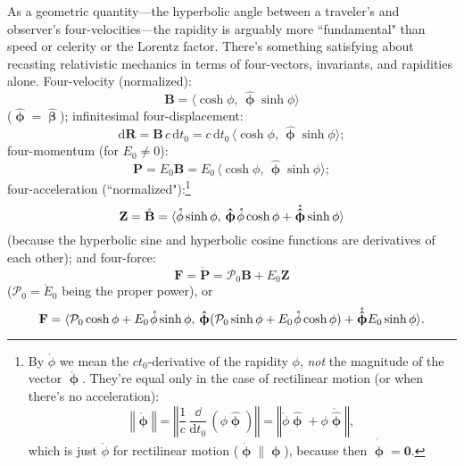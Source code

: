 \documentclass[12pt]{article}
\renewcommand{\vv}[1]{\mathbf{#1}}
\newcommand{\dd}[1]{\mathrm{d}#1}
\newcommand{\hatbeta}{\bm{\hat{\upbeta}}}
\newcommand{\vvphi}{\bm{\upphi}}
\newcommand{\hatphi}{\bm{\hat{\upphi}}}
\begin{document}
As a geometric quantity---the hyperbolic angle between a traveler's and observer's four-velocities---the rapidity is arguably more ``fundamental" than speed or celerity or the Lorentz factor. There's something satisfying about recasting relativistic mechanics in terms of four-vectors, invariants, and rapidities alone. Four-velocity (normalized):
\begin{equation*}
\vv B = \langle \cosh{\phi}, \, \hatphi \sinh{\phi} \rangle
\end{equation*}
($\hatphi = \hatbeta$); infinitesimal four-displacement:
\begin{equation*}
\dd \vv R = \vv B \, c \, \dd t_0 = c \, \dd t_0 \, \langle \cosh{\phi}, \, \hatphi \sinh{\phi} \rangle ;
\end{equation*}
four-momentum (for $E_0 \neq 0$):
\begin{equation*}
\vv P = E_0 \vv B = E_0 \, \langle \cosh{\phi}, \, \hatphi \sinh{\phi} \rangle ;
\end{equation*}
four-acceleration (``normalized"):\footnote{\label{fn:ph}By $\mathring{\phi}$ we mean the $ct_0$-derivative of the rapidity $\phi$, \emph{not} the magnitude of the vector $\mathring{\vvphi}$. They're equal only in the case of rectilinear motion (or when there's no acceleration):
\begin{equation*}
\left \Vert \mathring{\vvphi} \right \Vert = \left \Vert \dfrac{1}{c} \, \dfrac{\dd}{\dd t_0} \, ( \phi \hatphi ) \right \Vert = \left \Vert \mathring{\phi} \hatphi + \phi \mathring{\hatphi} \right \Vert,
\end{equation*}
which is just $\mathring{\phi}$ for rectilinear motion ($\mathring{\vvphi} \parallel \vvphi$), because then $\mathring{\hatphi} = \vv 0$.}
\begin{equation*}
\vv Z = \mathring{\vv B} = \langle  \mathring{\phi} \sinh{\phi} , \, \hatphi \mkern1.5mu \mathring{\phi} \cosh{\phi} + \mathring{\hatphi} \sinh{\phi} \rangle
\end{equation*}
(because the hyperbolic sine and hyperbolic cosine functions are derivatives of each other); and four-force:
\begin{equation*}
\vv F = \mathring{\vv P} = \mathcal{P}_0 \vv B + E_0 \vv Z
\end{equation*}
($\mathcal{P}_0 = \mathring{E}_0$ being the proper power), or
\begin{equation*}
\vv F = \langle \mathcal{P}_0 \cosh{\phi} + E_0 \mkern1.5mu \mathring{\phi} \sinh{\phi} , \, \hatphi ( \mathcal{P}_0 \sinh{\phi} + E_0 \mkern1.5mu \mathring{\phi} \cosh{\phi} ) + \mathring{\hatphi} E_0 \sinh{\phi} \rangle .
\end{equation*}
\end{document}
